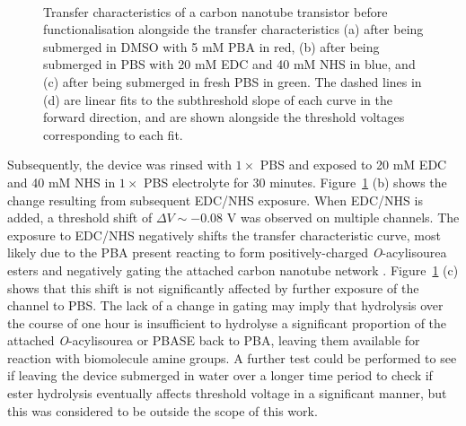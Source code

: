 \documentclass[
  a4paper,
]{scrbook}
\begin{document}
\begin{figure}
\begin{minipage}[t]{0.45\linewidth}
{{}

}

\end{minipage}%
%
\begin{minipage}[t]{0.01\linewidth}

{\centering 

~

}

\end{minipage}%

\caption[Transfer characteristics of a carbon nanotube transistor,
before and after functionalisation with PBA or PBA/EDC/NHS, as well as
after submersion in fresh PBS, alongside linear fits to the subthreshold
slope of each curve in the forward
direction.]{\label{fig-pba-functionalisation-threshold-shift}Transfer
characteristics of a carbon nanotube transistor before functionalisation
alongside the transfer characteristics (a) after being submerged in DMSO
with 5 mM PBA in red, (b) after being submerged in PBS with 20 mM EDC
and 40 mM NHS in blue, and (c) after being submerged in fresh PBS in
green. The dashed lines in (d) are linear fits to the subthreshold slope
of each curve in the forward direction, and are shown alongside the
threshold voltages corresponding to each fit.}

\end{figure}

Subsequently, the device was rinsed with \(1 \times\) PBS and exposed to
20 mM EDC and 40 mM NHS in \(1 \times\) PBS electrolyte for 30 minutes.
Figure~\ref{fig-pba-functionalisation-threshold-shift} (b) shows the
change resulting from subsequent EDC/NHS exposure. When EDC/NHS is
added, a threshold shift of \(\Delta V \sim -0.08\) V was observed on
multiple channels. The exposure to EDC/NHS negatively shifts the
transfer characteristic curve, most likely due to the PBA present
reacting to form positively-charged \emph{O}-acylisourea esters and
negatively gating the attached carbon nanotube network
\autocite{Heller2008,Hermanson2013-4}.
Figure~\ref{fig-pba-functionalisation-threshold-shift} (c) shows that
this shift is not significantly affected by further exposure of the
channel to PBS. The lack of a change in gating may imply that hydrolysis
over the course of one hour is insufficient to hydrolyse a significant
proportion of the attached \emph{O}-acylisourea or PBASE back to PBA,
leaving them available for reaction with biomolecule amine groups. A
further test could be performed to see if leaving the device submerged
in water over a longer time period to check if ester hydrolysis
eventually affects threshold voltage in a significant manner, but this
was considered to be outside the scope of this work.
\end{document}
